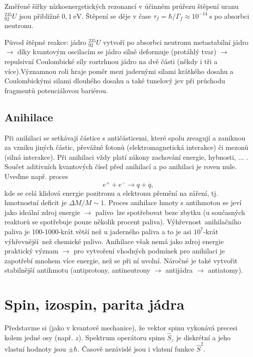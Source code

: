 \documentclass[../../main.tex]{subfiles}
\begin{document}
Změřené šířky nízkoenergetických rezonancí v účinném průřezu štěpení uranu $^{235}_{92} U$ jsou přibližně $0,1 ~\mathrm{eV}$. Štěpení se děje v čase $\tau_f = \hbar /\Gamma_f \approx 10^{-14} ~\mathrm{s}$ po absorbci neutronu.

Původ štěpné reakce: jádro $^{235}_{92} U$ vytvoří po absorbci neutronu metastabilní jádro $\rightarrow$ díky kvantovým oscilacím se jádro silně deformuje (protáhlý tvar) $\rightarrow$ repulsivní Coulombické síly roztrhnou jádro na dvě části (někdy i tři a více).Významnou roli hraje poměr mezi jadernými silami krátkého dosahu a Coulombickými silami dlouhého dosahu a také tunelový jev při průchodu fragmentů potenciálovou bariérou. 

\subsection{Anihilace}

Při anihilaci se setkávají částice s antičásticemi, které spolu zreagují a zaniknou za vzniku jiných částic, převážně fotonů (elektromagnetická interakce) či mezonů (silná interakce). Při anihilaci vždy platí zákony zachování energie, hybnosti, ... . Součet aditivních kvantových čísel před anihilací a po anihilaci je roven nule. Uveďme např. proces
\begin{equation}
e^+ + e^- \rightarrow q + \overline{q},
\end{equation}
kde se celá klidová energie pozitronu a elektronu přemění na záření, tj. hmotnostní deficit je $\Delta M/M \sim 1$. Proces anihilace hmoty s antihmotou se jeví jako ideální zdroj energie $\rightarrow$ \glqq palivo\grqq ~lze spotřebovat beze zbytku (u současných reaktorů se spotřebuje pouze několik procent paliva). \glqq Výhřevnost\grqq ~anihilačního paliva je 100-1000-krát větší než u jaderného paliva a to je asi $10^7$-krát \glqq výhřevnější\grqq ~než chemické palivo. Anihilace však nemá jako zdroj energie praktický význam $\rightarrow$ pro vytvoření vhodných podmínek pro anihilaci je zapotřebí mnohem více energie, než se při ní uvolní. Náročné je také vytvořit stabilnější antihmotu (antiprotony, antineutrony $\rightarrow$ antijádra $\rightarrow$ antiatomy).  


\section{Spin, izospin, parita jádra}

Představme si (jako v kvantové mechanice), že vektor spinu vykonává precesi kolem jedné osy (např. $z$). Spektrum operátoru spinu $\hat{S}_z$ je diskrétní a jeho vlastní hodnoty jsou $\pm \hbar$. Časově nezávislé jsou i vlatsní funkce $\hat{S} ^2$.
\end{document}

